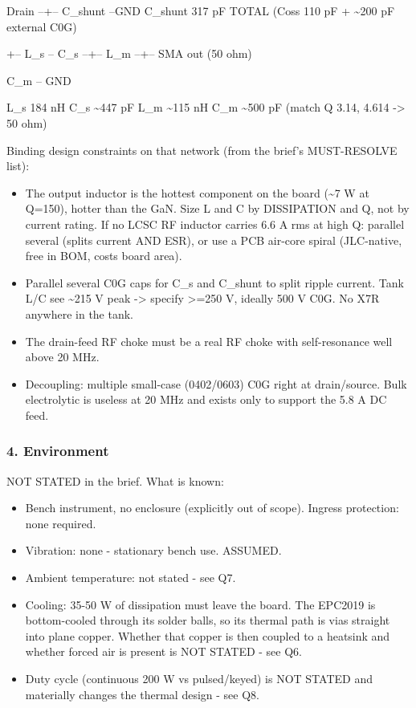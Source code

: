 \documentclass[11pt,a4paper]{article}
\begin{document}
Drain --+-- C\_shunt --GND        C\_shunt 317 pF TOTAL (Coss 110 pF + \textasciitilde{}200 pF external C0G)

\begin{quote}\small\ttfamily\raggedright
            \textbar{}
\end{quote}
+-- L\_s -- C\_s --+-- L\_m --+-- SMA out (50 ohm)

\begin{quote}\small\ttfamily\raggedright
                                       \textbar{}
\end{quote}
C\_m -- GND

L\_s 184 nH \textbar{} C\_s \textasciitilde{}447 pF \textbar{} L\_m \textasciitilde{}115 nH \textbar{} C\_m \textasciitilde{}500 pF (match Q 3.14, 4.614 -\textgreater{} 50 ohm)

Binding design constraints on that network (from the brief's MUST-RESOLVE list):

\begin{itemize}
\item The output inductor is the hottest component on the board (\textasciitilde{}7 W at Q=150), hotter than the GaN.
Size L and C by DISSIPATION and Q, not by current rating. If no LCSC RF inductor carries 6.6 A
rms at high Q: parallel several (splits current AND ESR), or use a PCB air-core spiral
(JLC-native, free in BOM, costs board area).
\item Parallel several C0G caps for C\_s and C\_shunt to split ripple current. Tank L/C see \textasciitilde{}215 V peak
-\textgreater{} specify \textgreater{}=250 V, ideally 500 V C0G. No X7R anywhere in the tank.
\item The drain-feed RF choke must be a real RF choke with self-resonance well above 20 MHz.
\item Decoupling: multiple small-case (0402/0603) C0G right at drain/source. Bulk electrolytic is
useless at 20 MHz and exists only to support the 5.8 A DC feed.
\end{itemize}
\subsubsection*{4. Environment}
NOT STATED in the brief. What is known:

\begin{itemize}
\item Bench instrument, no enclosure (explicitly out of scope). Ingress protection: none required.
\item Vibration: none - stationary bench use. ASSUMED.
\item Ambient temperature: not stated - see Q7.
\item Cooling: 35-50 W of dissipation must leave the board. The EPC2019 is bottom-cooled through its
solder balls, so its thermal path is vias straight into plane copper. Whether that copper is
then coupled to a heatsink and whether forced air is present is NOT STATED - see Q6.
\item Duty cycle (continuous 200 W vs pulsed/keyed) is NOT STATED and materially changes the thermal
design - see Q8.
\end{itemize}
\end{document}

